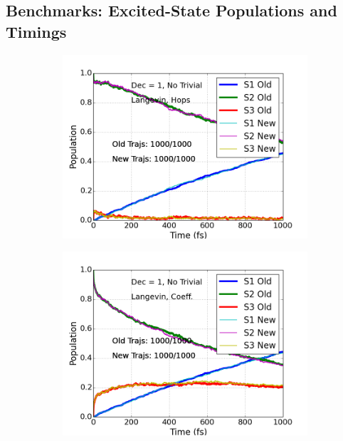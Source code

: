 \documentclass[letterpaper,12pt,titlepage]{article}
\begin{document}
\begin{appendix}
\subsection{Benchmarks: Excited-State Populations and Timings}
\label{benchmark_excpop_timing}
\begin{figure}[h]
        \centering
        \begin{subfigure}[h]{0.425\textwidth}
            \centering
            \includegraphics[scale=.35]{ppv_es_traj_decohere1_notrivial_langevin_hops_old_v_new.png}
        \end{subfigure}
	\hspace{3mm}
        \begin{subfigure}[h]{0.425\textwidth}  
            \centering 
            \includegraphics[scale=.35]{ppv_es_traj_decohere1_notrivial_langevin_coeff_old_v_new.png}

\end{subfigure}
\end{figure}
\end{appendix}
\end{document}
